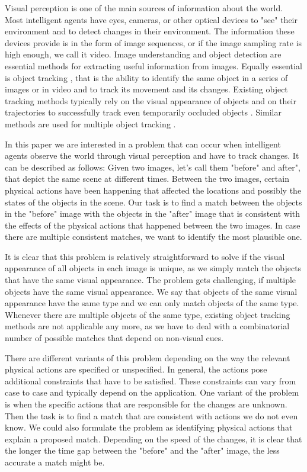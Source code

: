 \documentclass[letterpaper]{article}
\begin{document}
Visual perception is one of the main sources of information about the world. Most intelligent agents have eyes, cameras, or other optical devices to "see" their environment and to detect changes in their environment. The information these devices provide is in the form of image sequences, or if the image sampling rate is high enough, we call it video.
Image understanding \cite{sonka1999image,sridhar2011video} and object detection \cite{papageorgiou1998general} are essential methods for extracting useful information from images. Equally essential is object tracking \cite{yilmaz2006object}, that is the ability to identify the same object in a series of images or in video and to track its movement and its changes. Existing object tracking methods typically rely on the visual appearance of objects and on their trajectories to successfully track even temporarily occluded objects \cite{yilmaz2004contour,cutler2000robust,viola2005detecting}.
Similar methods are used for multiple object tracking \cite{berclaz2011multiple,yang2005fast,han2004algorithm}. 

In this paper we are interested in a problem that can occur when intelligent agents observe the world through visual perception and have to track changes.
It can be described as follows: Given two images, let's call them "before" and after", that depict the same scene at different times. Between the two images, certain physical actions have been happening that affected the locations and possibly the states of the objects in the scene. Our task is to find a match between the objects in the "before" image with the objects in the "after" image that is consistent with the effects of the physical actions that happened between the two images. In case there are multiple consistent matches, we want to identify the most plausible one.

It is clear that this problem is relatively straightforward to solve if the visual appearance of all objects in each image is unique, as we simply match the objects that have the same visual appearance. The problem gets challenging, if multiple objects have the same visual appearance. We say that objects of the same visual appearance have the same type and we can only match objects of the same type. Whenever there are multiple objects of the same type, existing object tracking methods are not applicable any more, as we have to deal with a combinatorial number of possible matches that depend on non-visual cues. 

There are different variants of this problem depending on the way the relevant physical actions are specified or unspecified. In general, the actions pose additional constraints that have to be satisfied. These constraints can vary from case to case and typically depend on the application. One variant of the problem is when the specific actions that are responsible for the changes are unknown. 
Then the task is to find a match that are consistent with actions we do not even know. 
We could also formulate the problem as identifying physical actions that explain a proposed match.
Depending on the speed of the changes, it is clear that the longer the time gap between the "before" and the "after" image, the less accurate a match might be.
\end{document}
